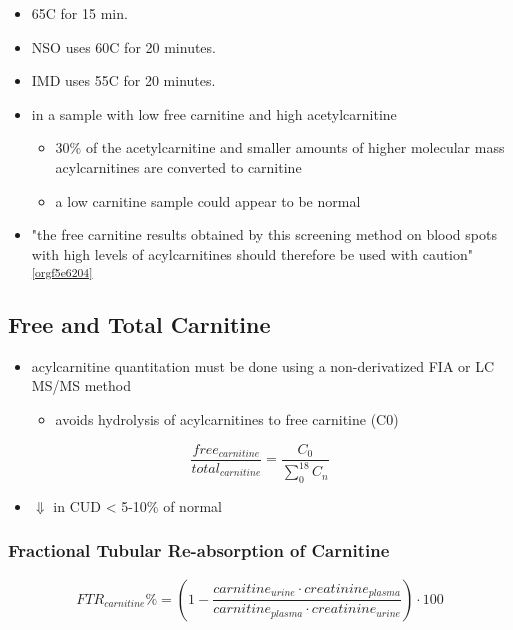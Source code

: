 \documentclass[12pt]{scrartcl}
\begin{document}
\begin{itemize}
\item 65\degree{}C for 15 min.
\item NSO uses 60\degree{}C for 20 minutes.
\item IMD uses 55\degree{}C for 20 minutes.

\item in a sample with low free carnitine and high acetylcarnitine
\begin{itemize}
\item 30\% of the acetylcarnitine and smaller amounts of higher
molecular mass acylcarnitines are converted to carnitine
\item a low carnitine sample could appear to be normal
\end{itemize}
\item "the free carnitine results obtained by this screening method on
blood spots with high levels of acylcarnitines should therefore be
used with caution" \textsuperscript{\ref{orgf5e6204}}
\end{itemize}


\subsection{Free and Total Carnitine}
\label{sec:orgbc0c1b9}
\begin{itemize}
\item acylcarnitine quantitation must be done using a non-derivatized FIA
or LC MS/MS method
\begin{itemize}
\item avoids hydrolysis of acylcarnitines to free carnitine (C0)
\end{itemize}
\end{itemize}

\[
\frac{free_{carnitine}}{total_{carnitine}} = \frac{C_0}{\sum_{0}^{18} C_n}
\]

\begin{itemize}
\item \(\Downarrow\) in CUD \textless{} 5-10\% of normal
\end{itemize}


\subsubsection{Fractional Tubular Re-absorption of Carnitine}
\label{sec:org11cb1d7}

\begin{equation*}
FTR_{carnitine}\% = \left( 1 -  \frac{carnitine_{urine} \cdot creatinine_{plasma}}{carnitine_{plasma} \cdot creatinine_{urine}}\right) \cdot 100
\end{equation*}
\end{document}
